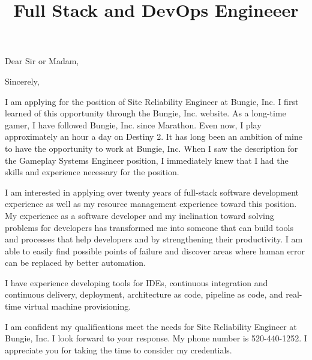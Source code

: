 \documentclass[11pt,a4paper,sans]{moderncv}        %
\title{Full Stack and DevOps Engineeer}                               %
\begin{document}
\opening{Dear Sir or Madam,}
\closing{Sincerely,}
\makelettertitle


I am applying for the position of Site Reliability Engineer at Bungie, Inc. I first learned of this opportunity through the Bungie, Inc. website. 
As a long-time gamer, I have followed Bungie, Inc. since Marathon. Even now, I play approximately an hour a day on Destiny 2. It has long been an 
ambition of mine to have the opportunity to work at Bungie, Inc. When I saw the description for the Gameplay Systems Engineer position, I immediately
knew that I had the skills and experience necessary for the position.

I am interested in applying over twenty years of full-stack software development experience as well as my resource management experience toward this position. My experience as a software developer and my inclination toward solving problems for developers has transformed me into someone that can build tools and processes that help developers and by strengthening their productivity. I am able to easily find possible points of failure and discover areas where human error can be replaced by better automation.

I have experience developing tools for IDEs, continuous integration and continuous delivery, deployment, architecture as code, pipeline as code, and real-time virtual machine provisioning. 

I am confident my qualifications meet the needs for Site Reliability Engineer at Bungie, Inc. I look forward to your response. My phone number is 520-440-1252.
I appreciate you for taking the time to consider my credentials.


\makeletterclosing
\end{document}
